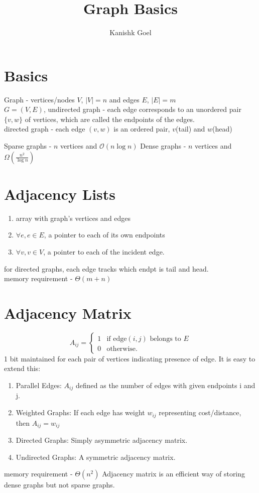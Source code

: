 \documentclass{article}
\title{Graph Basics}
\author{Kanishk Goel}
\begin{document}
	\maketitle
	
	\section{Basics}
	Graph - vertices/nodes $V$, $|V| = n$ and edges $E$, $|E| = m$ \\ $G = (V,E)$, undirected graph - each edge corresponds to an unordered pair $\{v,w\}$ of vertices, which are called the endpoints of the edges. \\
	directed graph - each edge $(v,w)$ is an ordered pair, $v$(tail) and $w$(head)
	
	Sparse graphs - $n$ vertices and $\mathcal{O}(n \log n)$
	Dense graphs - $n$ vertices and $\Omega(\frac{n^2}{\log n})$
	\section{Adjacency Lists}
	\begin{enumerate}
		\item array with graph's vertices and edges
		\item $\forall e, e \in E$, a pointer to each of its own endpoints
		\item $\forall v, v \in V$, a pointer to each of the incident edge.
	\end{enumerate}
	for directed graphs, each edge tracks which endpt is tail and head. \\ memory requirement - $\Theta(m+n)$
	\section{Adjacency Matrix}
	$$A_{ij} = 
	\begin{cases}
	1 & \text{if edge} (i,j) \text{ belongs to } E \\
	0 & \text{otherwise.}
	\end{cases}
	$$
	1 bit maintained for each pair of vertices indicating presence of edge.
	It is easy to extend this:
	\begin{enumerate}
		\item Parallel Edges: $A_{ij}$ defined as the number of edges with given endpoints i and j.
		\item Weighted Graphs: If each edge has weight $w_{ij}$ representing cost/distance, then $A_{ij} = w_{ij}$
		\item Directed Graphs: Simply asymmetric adjacency matrix.
		\item Undirected Graphs: A symmetric adjacency matrix.
	\end{enumerate}
	memory requirement - $\Theta(n^2)$
	Adjacency matrix is an efficient way of storing dense graphs but not sparse graphs.
\end{document}
